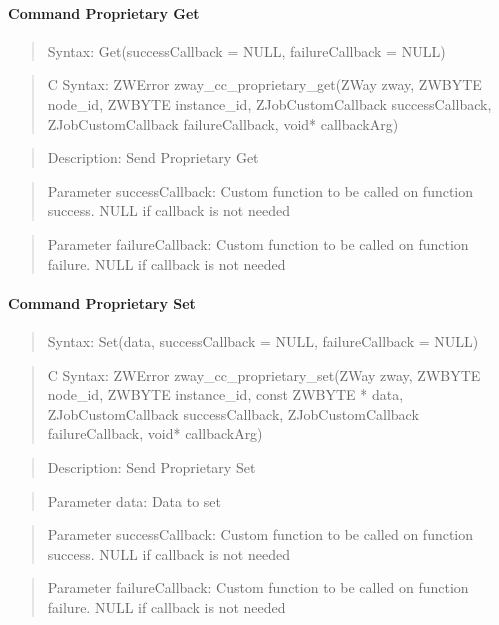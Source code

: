 \paragraph{Command Proprietary Get}
\begin{quote}Syntax: Get(successCallback = NULL, failureCallback = NULL)\end{quote}
\begin{quote}C Syntax: ZWError zway\_cc\_proprietary\_get(ZWay zway, ZWBYTE node\_id, ZWBYTE instance\_id, ZJobCustomCallback successCallback, ZJobCustomCallback failureCallback, void* callbackArg)\end{quote}
\begin{quote}Description: Send Proprietary Get\end{quote}
\begin{quote}Parameter successCallback: Custom function to be called on function success. NULL if callback is not needed\end{quote}
\begin{quote}Parameter failureCallback: Custom function to be called on function failure. NULL if callback is not needed\end{quote}


\paragraph{Command Proprietary Set}
\begin{quote}Syntax: Set(data, successCallback = NULL, failureCallback = NULL)\end{quote}
\begin{quote}C Syntax: ZWError zway\_cc\_proprietary\_set(ZWay zway, ZWBYTE node\_id, ZWBYTE instance\_id, const ZWBYTE * data, ZJobCustomCallback successCallback, ZJobCustomCallback failureCallback, void* callbackArg)\end{quote}
\begin{quote}Description: Send Proprietary Set\end{quote}
\begin{quote}Parameter data: Data to set\end{quote}
\begin{quote}Parameter successCallback: Custom function to be called on function success. NULL if callback is not needed\end{quote}
\begin{quote}Parameter failureCallback: Custom function to be called on function failure. NULL if callback is not needed\end{quote}



